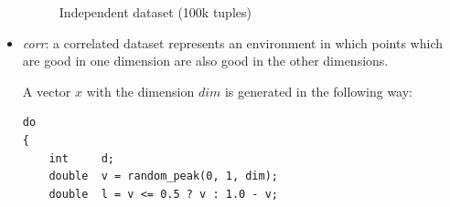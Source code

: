 \begin{itemize}
\begin{figure}[htbp]
\centering
{}%
%
%
\caption{Independent dataset (100k tuples)}%
\label{fig:density-2d-i2d1e5}%
\end{figure}

\pagebreak[4]

\item \emph{corr}: 
a correlated dataset represents an environment in which points which
are good in one dimension are also good in the other dimensions. 


A vector $x$ with the dimension $dim$ is generated in the following way:

\begin{lstlisting}
do
{
	int		d;
	double	v = random_peak(0, 1, dim);
	double	l = v <= 0.5 ? v : 1.0 - v;
	

\end{lstlisting}
\end{itemize}
